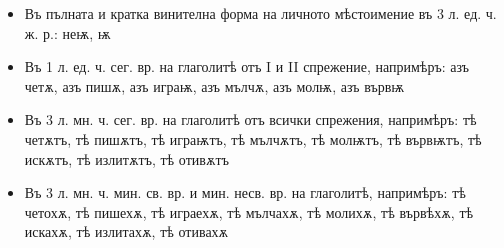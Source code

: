 \documentclass{article}
\begin{document}
	
\begin{itemize}
	\item Въ пълната и кратка винителна форма на личното мѣстоимение въ 3 л. ед. ч. ж. р.: неѭ, ѭ
	
	\item Въ 1 л. ед. ч. сег. вр. на глаголитѣ отъ I и II спрежение, напримѣръ: азъ четѫ, азъ пишѫ, азъ играѭ, азъ мълчѫ, азъ молѭ, азъ вървѭ
	
	\item Въ 3 л. мн. ч. сег. вр. на глаголитѣ отъ всички спрежения, напримѣръ: тѣ четѫтъ, тѣ пишѫтъ, тѣ играѭтъ, тѣ мълчѫтъ, тѣ молѭтъ, тѣ вървѭтъ, тѣ искѫтъ, тѣ излитѫтъ, тѣ отивѫтъ
	
	\item Въ 3 л. мн. ч. мин. св. вр. и мин. несв. вр. на глаголитѣ, напримѣръ: тѣ четохѫ, тѣ пишехѫ, тѣ играехѫ, тѣ мълчахѫ, тѣ молихѫ, тѣ вървѣхѫ, тѣ искахѫ, тѣ излитахѫ, тѣ отивахѫ
\end{itemize}


	
\end{document}
